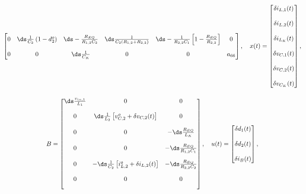 \begin{gather}
\begin{bmatrix}
    0                         & \ds \frac{1}{C_2} \left( 1 - d_2^o \right) & \ds - \frac{R_{EQ}}{R_{1,2} C_2} & \ds \frac{1}{C_2 \left(R_{1,2} + R_{2,2}\right)}                     & \ds - \frac{1}{R_{2,2}C_1} \left[ 1 - \frac{R_{EQ}}{R_{2,2}} \right]                          & 0                   \\[12pt]
    0                         & 0                                          & \ds \frac{1}{C_K}                & 0                                                                    & 0                                                                                             & a_{66}
  \end{bmatrix}, \quad
  x(t) = \begin{bmatrix}
    \delta i_{L,1}(t) \\[12pt] \delta i_{L,2}(t) \\[12pt] \delta i_{L_K}(t) \\[12pt]
    \delta v_{C,1}(t) \\[12pt] \delta v_{C,2}(t) \\[12pt] \delta v_{C_K}(t)
  \end{bmatrix}, \notag \\[12pt]
  B = \begin{bmatrix}
    \ds \frac{v_{in,1}}{L_1} & 0                                                                & 0                               \\[12pt]
    0                        & \ds \frac{1}{L_2} \left[ v_{C,2}^o + \delta v_{C,2}(t) \right]   & 0
    \\[12pt]
    0                        & 0                                                                & - \ds \frac{R_{EQ}}{L_K}        \\[12pt]
    0                        & 0                                                                & - \ds \frac{R_{EQ}}{R_{1,2}C_1} \\[12pt]
    0                        & - \ds \frac{1}{C_2} \left[ i_{L,2}^o + \delta i_{L,2}(t) \right] & - \ds \frac{R_{EQ}}{R_{2,2}C_2} \\[12pt]
    0                        & 0                                                                & 0
    \\[12pt]
  \end{bmatrix}, \quad
  u(t) = \begin{bmatrix}
    \delta d_1(t) \\[12pt] \delta d_2(t) \\[12pt] \delta i_{B}(t)
  \end{bmatrix}, \notag \\[12pt]

\end{gather}
